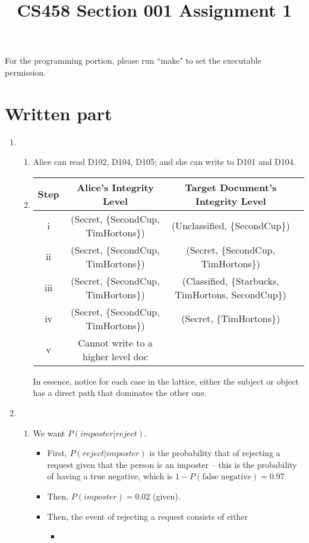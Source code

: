 \documentclass[12pt]{article}
\title{CS458 Section 001 Assignment 1}
\begin{document}
\maketitle

For the programming portion, please run ``make" to set the executable permission.

\section*{Written part}
\begin{enumerate}
\item
\begin{enumerate}
\item
Alice can read D102, D104, D105; and she can write to D101 and D104.
\item
\begin{tabular}{|c|c|c|c|}
\hline
Step & Alice's Integrity Level & Target Document's Integrity Level \\\hline
i & (Secret, \{SecondCup, TimHortons\}) & (Unclassified, \{SecondCup\}) \\
ii & (Secret, \{SecondCup, TimHortons\}) & (Secret, \{SecondCup, TimHortons\})\\
iii & (Secret, \{SecondCup, TimHortons\}) & (Classified, \{Starbucks, TimHortons, SecondCup\})\\
iv & (Secret, \{SecondCup, TimHortons\}) & (Secret, \{TimHortons\})\\
v & Cannot write to a higher level doc \\
\hline
\end{tabular}
In essence, notice for each case in the lattice, either the subject or object has a direct path that dominates the other one.
\end{enumerate}
\item
\begin{enumerate}
\item
We want $P(imposter|reject)$.
\begin{itemize}
\item
First, $P(reject|imposter)$ is the probability that of rejecting a request given that the person is an imposter -- this is the probability of having a true negative, which is $1 - P(\text{false negative}) = 0.97$.
\item
Then, $P(imposter) = 0.02$ (given).
\item
Then, the event of rejecting a request consists of either
\begin{itemize}
\item

\end{itemize}
\end{itemize}
\end{enumerate}
\end{enumerate}
\end{document}
